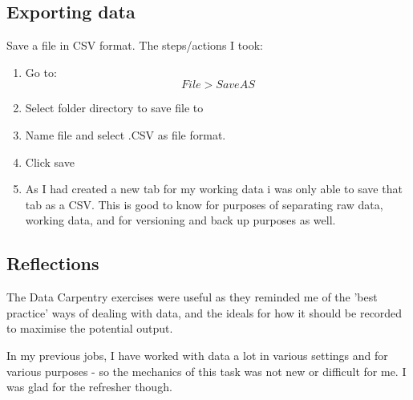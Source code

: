 \documentclass{article}
\begin{document}
\subsection{Exporting data}
Save a file in CSV format.
The steps/actions I took:
\begin{enumerate}
    \item Go to: \[File > Save AS\]
    \item Select folder directory to save file to
    \item Name file and select .CSV as file format.
    \item Click save
    \item As I had created a new tab for my working data i was only able to save that tab as a CSV. This is good to know for purposes of separating raw data, working data, and for versioning and back up purposes as well. 
\end{enumerate}

\subsection{Reflections}
The Data Carpentry exercises were useful as they reminded me of the 'best practice' ways of dealing with data, and the ideals for how it should be recorded to maximise the potential output. 

In my previous  jobs, I have worked with data a lot in various settings and for various purposes - so the mechanics of this task was not new or difficult for me. I was glad for the refresher though. 
\end{document}
